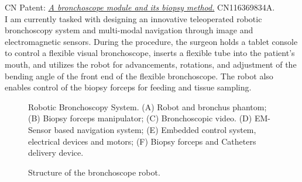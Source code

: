 \documentclass[
    ngerman,american
    ]{scrartcl}
\begin{document}
CN Patent: \emph{\href{https://www.researchgate.net/publication/372234328_CN_Patent_yizhongzhiqiguanjingmozujiqihuojianfangfahecaiyongqideshoushujiqiren}{A bronchoscope module and its biopsy method.}}  CN116369834A.
~\\

I am currently tasked with designing an innovative teleoperated robotic bronchoscopy system and multi-modal navigation through image and electromagnetic sensors. During the procedure, the surgeon holds a tablet console to control a flexible visual bronchoscope, inserts a flexible tube into the patient's mouth, and utilizes the robot for advancements, rotations, and adjustment of the bending angle of the front end of the flexible bronchoscope. The robot also enables control of the biopsy forceps for feeding and tissue sampling. 

\begin{figure}[H]
	\caption{Robotic Bronchoscopy System. (A) Robot and bronchus phantom; (B) Biopsy forceps manipulator; (C) Bronchoscopic video. (D) EM-Sensor based navigation system; (E) Embedded control system, electrical devices and motors; (F) Biopsy forceps and Catheters delivery device.}
	\label{RBSystem}
\end{figure}



\begin{figure}[H]
	\caption{Structure of the bronchoscope robot.}
	\label{structure}
\end{figure}
\end{document}
